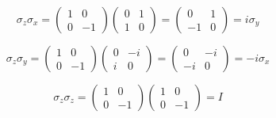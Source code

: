 \begin{enumerate}
    $$
    \sigma_z\sigma_x = 
    \begin{pmatrix}
        1 & 0\\
        0 & -1
    \end{pmatrix}
    \begin{pmatrix}
        0 & 1\\
        1 & 0
    \end{pmatrix}
    =\begin{pmatrix}
        0 & 1\\
        -1 & 0
    \end{pmatrix}
    =i\sigma_y
    $$
    
    $$
    \sigma_z\sigma_y = 
    \begin{pmatrix}
        1 & 0\\
        0 & -1
    \end{pmatrix}
    \begin{pmatrix}
        0 & -i\\
        i & 0
    \end{pmatrix}
    =\begin{pmatrix}
        0 & -i\\
        -i & 0
    \end{pmatrix}
    =-i\sigma_x
    $$

    $$
    \sigma_z\sigma_z = 
    \begin{pmatrix}
        1 & 0\\
        0 & -1
    \end{pmatrix}
    \begin{pmatrix}
        1 & 0\\
        0 & -1
    \end{pmatrix}
    =I
    $$
    
\end{enumerate}

